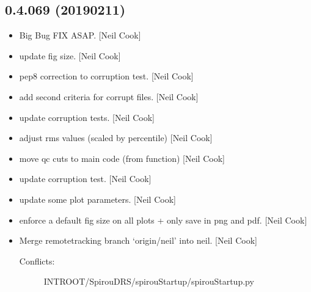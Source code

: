 \documentclass[a4paper,10pt,english]{report}
\begin{document}
\subsection{0.4.069 (2019\sphinxhyphen{}02\sphinxhyphen{}11)}
\label{\detokenize{misc/changelog:id207}}\begin{itemize}
\item {} 
 \sphinxhyphen{} Big Bug FIX ASAP. {[}Neil Cook{]}

\item {} 
 \sphinxhyphen{} update  fig size. {[}Neil
Cook{]}

\item {} 
 \sphinxhyphen{} pep8 correction to corruption test. {[}Neil Cook{]}

\item {} 
 \sphinxhyphen{} add second criteria for corrupt files.
{[}Neil Cook{]}

\item {} 
 \sphinxhyphen{} update corruption tests. {[}Neil Cook{]}

\item {} 
 \sphinxhyphen{} adjust rms values (scaled by percentile) {[}Neil Cook{]}

\item {} 
 \sphinxhyphen{} move qc cuts to main code (from function)
{[}Neil Cook{]}

\item {} 
 \sphinxhyphen{} update corruption test. {[}Neil Cook{]}

\item {} 
 \sphinxhyphen{} update some plot parameters. {[}Neil Cook{]}

\item {} 
 \sphinxhyphen{} enforce a default fig size on all plots + only save in
png and pdf. {[}Neil Cook{]}

\item {} 
Merge remote\sphinxhyphen{}tracking branch ‘origin/neil’ into neil. {[}Neil Cook{]}
\begin{description}
\item[{Conflicts:}] \leavevmode
INTROOT/SpirouDRS/spirouStartup/spirouStartup.py


\end{description}
\end{itemize}
\end{document}

